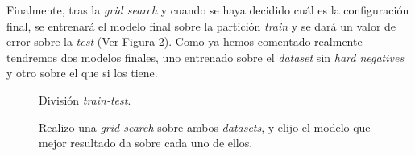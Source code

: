 Finalmente, tras la \textit{grid search} y cuando se haya decidido cuál es la configuración final, se entrenará el modelo final sobre la partición \textit{train} y se dará un valor de error sobre la \textit{test} (Ver Figura \ref{fig:grid-search}). Como ya hemos comentado realmente tendremos dos modelos finales, uno entrenado sobre el \textit{dataset} sin \textit{hard negatives} y otro sobre el que si los tiene.

\begin{figure}[H]
\centering
    \caption{División \textit{train-test}.} 
    \label{fig:train-test}
\end{figure}

\begin{figure}[H]
\centering
    \caption{Realizo una \textit{grid search} sobre ambos \textit{datasets}, y elijo el modelo que mejor resultado da sobre cada uno de ellos.} 
    \label{fig:grid-search}
\end{figure}